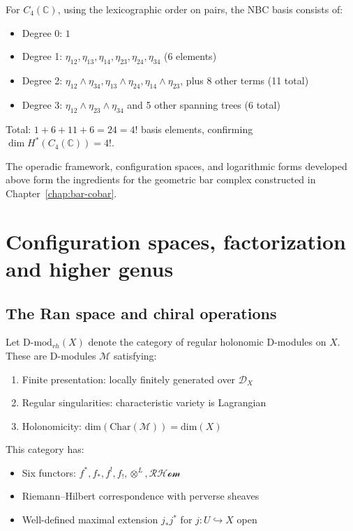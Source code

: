 \begin{example}[NBC basis for \texorpdfstring{$n = 4$}{n = 4}]\label{ex:NBC4}
For $C_4(\mathbb{C})$, using the lexicographic order on pairs, the NBC basis consists of:
\begin{itemize}
\item Degree 0: $1$
\item Degree 1: $\eta_{12}, \eta_{13}, \eta_{14}, \eta_{23}, \eta_{24}, \eta_{34}$ (6 elements)
\item Degree 2: $\eta_{12} \wedge \eta_{34}, \eta_{13} \wedge \eta_{24}, \eta_{14} \wedge \eta_{23}$, plus 8 other terms (11 total)
\item Degree 3: $\eta_{12} \wedge \eta_{23} \wedge \eta_{34}$ and 5 other spanning trees (6 total)
\end{itemize}
Total: $1 + 6 + 11 + 6 = 24 = 4!$ basis elements, confirming $\dim H^*(C_4(\mathbb{C})) = 4!$.
\end{example}

The operadic framework, configuration spaces, and logarithmic forms
developed above form the ingredients for the geometric bar complex
constructed in Chapter~\ref{chap:bar-cobar}.

\section{Configuration spaces, factorization and higher genus}

\subsection{The Ran space and chiral operations}

\begin{definition}
Let $\text{D-mod}_{rh}(X)$ denote the category of regular holonomic
D-modules on $X$.
These are D-modules $\mathcal{M}$ satisfying:
\begin{enumerate}
\item Finite presentation: locally finitely generated over $\mathcal{D}_X$
\item Regular singularities: characteristic variety is Lagrangian
\item Holonomicity: $\text{dim}(\text{Char}(\mathcal{M})) = \text{dim}(X)$
\end{enumerate}
This category has:
\begin{itemize}
\item Six functors: $f^*, f_*, f^!, f_!, \otimes^L, \mathcal{RHom}$
\item Riemann--Hilbert correspondence with perverse sheaves
\item Well-defined maximal extension $j_*j^*$ for $j: U \hookrightarrow X$ open
\end{itemize}
\end{definition}


